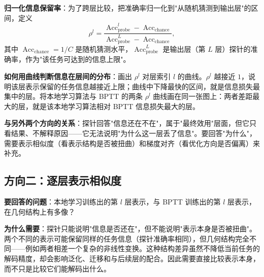 \documentclass[journal,12pt,onecolumn]{IEEEtran}
\begin{document}
\textbf{归一化信息保留率}：为了跨层比较，把准确率归一化到"从随机猜测到输出层"的区间，定义
\begin{equation}
\rho^l = \frac{\operatorname{Acc}^l_{\mathrm{probe}} - \operatorname{Acc}_{\mathrm{chance}}}{\operatorname{Acc}^L_{\mathrm{probe}} - \operatorname{Acc}_{\mathrm{chance}}},
\end{equation}
其中 $\operatorname{Acc}_{\mathrm{chance}}=1/C$ 是随机猜测水平，$\operatorname{Acc}^L_{\mathrm{probe}}$ 是输出层（第 $L$ 层）探针的准确率，作为"该任务可达到的信息上限"。

\textbf{如何用曲线判断信息在层间的分布}：画出 $\rho^l$ 对层索引 $l$ 的曲线。$\rho^l$ 越接近 $1$，说明该层表示保留的任务信息越接近上限；曲线中下降最快的区间，就是信息损失最集中的层。将本地学习算法与 BPTT 的两条 $\rho^l$ 曲线画在同一张图上：两者差距最大的层，就是该本地学习算法相对 BPTT 信息损失最大的层。

\textbf{与另外两个方向的关系}：探针回答"信息还在不在"，属于"最终效用"层面，但它只看结果、不解释原因——它无法说明"为什么这一层丢了信息"。要回答"为什么"，需要表示相似度（看表示结构是否被扭曲）和梯度对齐（看优化方向是否偏离）来补充。

\subsection{方向二：逐层表示相似度}

\textbf{要回答的问题}：本地学习训练出的第 $l$ 层表示，与 BPTT 训练出的第 $l$ 层表示，在几何结构上有多像？

\textbf{为什么需要}：探针只能说明"信息是否还在"，但不能说明"表示本身是否被扭曲"。两个不同的表示可能保留同样的任务信息（探针准确率相同），但几何结构完全不同——例如两者相差一个复杂的非线性变换。这种结构差异虽然不降低当前任务的解码精度，却会影响泛化、迁移和与后续层的配合。因此需要直接比较表示本身，而不只是比较它们能解码出什么。
\end{document}
